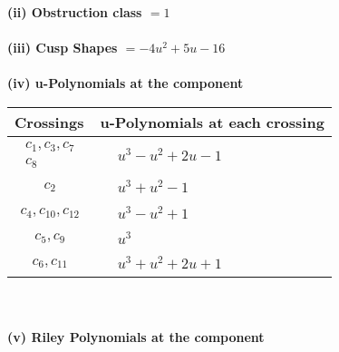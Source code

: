 \documentclass[1p]{elsarticle_modified}
\theoremstyle{definition}
\begin{document}
\flushleft \textbf{(ii) Obstruction class $= 1$}\\~\\
\flushleft \textbf{(iii) Cusp Shapes $= -4 u^2+5 u-16$}\\~\\
\newpage\renewcommand{\arraystretch}{1}
\flushleft \textbf{(iv) u-Polynomials at the component}\newline \\
\begin{tabular}{m{50pt}|m{274pt}}
Crossings & \hspace{64pt}u-Polynomials at each crossing \\
\hline $$\begin{aligned}c_{1},c_{3},c_{7}\\c_{8}\end{aligned}$$&$\begin{aligned}
&u^3- u^2+2 u-1
\end{aligned}$\\
\hline $$\begin{aligned}c_{2}\end{aligned}$$&$\begin{aligned}
&u^3+u^2-1
\end{aligned}$\\
\hline $$\begin{aligned}c_{4},c_{10},c_{12}\end{aligned}$$&$\begin{aligned}
&u^3- u^2+1
\end{aligned}$\\
\hline $$\begin{aligned}c_{5},c_{9}\end{aligned}$$&$\begin{aligned}
&u^3
\end{aligned}$\\
\hline $$\begin{aligned}c_{6},c_{11}\end{aligned}$$&$\begin{aligned}
&u^3+u^2+2 u+1
\end{aligned}$\\
\hline
\end{tabular}\\~\\
\newpage\renewcommand{\arraystretch}{1}
\flushleft \textbf{(v) Riley Polynomials at the component}\newline \\
\end{document}
